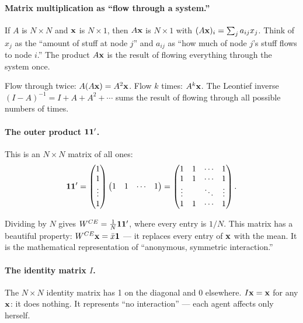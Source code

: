 \documentclass[../structural_economics_book.tex]{subfiles}
\begin{document}
\paragraph{Matrix multiplication as ``flow through a system.''} If $A$ is $N \times N$ and $\mathbf{x}$ is $N \times 1$, then $A\mathbf{x}$ is $N \times 1$ with $(A\mathbf{x})_i = \sum_j a_{ij}x_j$. Think of $x_j$ as the ``amount of stuff at node $j$'' and $a_{ij}$ as ``how much of node $j$'s stuff flows to node $i$.'' The product $A\mathbf{x}$ is the result of flowing everything through the system once.

Flow through twice: $A(A\mathbf{x}) = A^2\mathbf{x}$. Flow $k$ times: $A^k\mathbf{x}$. The Leontief inverse $(I - A)^{-1} = I + A + A^2 + \cdots$ sums the result of flowing through all possible numbers of times.

\paragraph{The outer product $\mathbf{1}\mathbf{1}'$.} This is an $N \times N$ matrix of all ones:
\begin{equation}
\mathbf{1}\mathbf{1}' = \begin{pmatrix} 1 \\ 1 \\ \vdots \\ 1 \end{pmatrix} \begin{pmatrix} 1 & 1 & \cdots & 1 \end{pmatrix} = \begin{pmatrix} 1 & 1 & \cdots & 1 \\ 1 & 1 & \cdots & 1 \\ \vdots & & \ddots & \vdots \\ 1 & 1 & \cdots & 1 \end{pmatrix}.
\end{equation}

Dividing by $N$ gives $W^{CE} = \frac{1}{N}\mathbf{1}\mathbf{1}'$, where every entry is $1/N$. This matrix has a beautiful property: $W^{CE}\mathbf{x} = \bar{x}\mathbf{1}$ --- it replaces every entry of $\mathbf{x}$ with the mean. It is the mathematical representation of ``anonymous, symmetric interaction.''

\paragraph{The identity matrix $I$.} The $N \times N$ identity matrix has 1 on the diagonal and 0 elsewhere. $I\mathbf{x} = \mathbf{x}$ for any $\mathbf{x}$: it does nothing. It represents ``no interaction'' --- each agent affects only herself.
\end{document}
